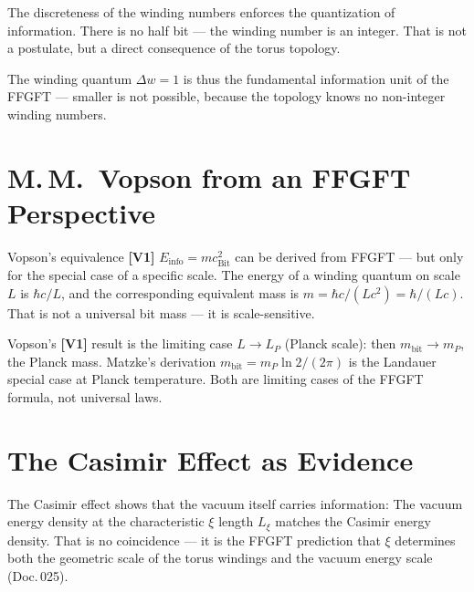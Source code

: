 The discreteness of the winding numbers enforces the quantization of
information. There is no half bit --- the winding number is an integer.
That is not a postulate, but a direct consequence of the torus topology.

The winding quantum $\Delta w = 1$ is thus the fundamental
information unit of the FFGFT --- smaller is not possible, because the topology
knows no non-integer winding numbers.

\section{M.\,M.~Vopson from an FFGFT Perspective}

Vopson's equivalence \textbf{[V1]} $E_{\text{info}} = mc^2_{\text{Bit}}$ can be
derived from FFGFT --- but only for the special case of a specific scale.
The energy of a winding quantum on scale $L$ is $\hbar c / L$, and the
corresponding equivalent mass is $m = \hbar c / (Lc^2) = \hbar / (Lc)$.
That is not a universal bit mass --- it is scale-sensitive.

Vopson's \textbf{[V1]} result is the limiting case $L \to L_P$ (Planck scale):
then $m_{\text{bit}} \to m_P$, the Planck mass. Matzke's derivation
$m_{\text{bit}} = m_P \ln 2 / (2\pi)$ is the Landauer special case at
Planck temperature. Both are limiting cases of the FFGFT formula, not
universal laws.

\section{The Casimir Effect as Evidence}

The Casimir effect shows that the vacuum itself carries information:
The vacuum energy density at the characteristic $\xi$ length $L_\xi$
matches the Casimir energy density. That is no coincidence ---
it is the FFGFT prediction that $\xi$ determines both the geometric scale
of the torus windings and the vacuum energy scale (Doc.\,025).